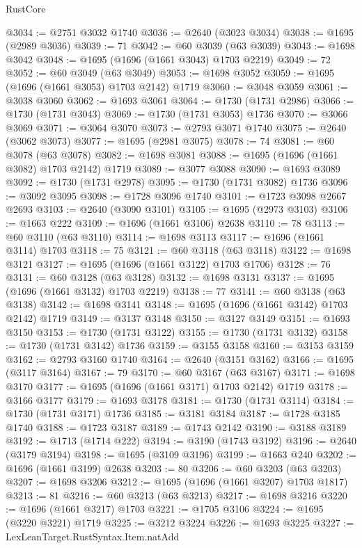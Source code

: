 \begin{lexlean}{RustCore}
\begin{coremodule}
@3034 := @2751 @3032 @1740
@3036 := @2640 (@3023 @3034)
@3038 := @1695 (@2989 @3036)
@3039 := 71
@3042 := @60 @3039 (@63 @3039)
@3043 := @1698 @3042
@3048 := @1695 (@1696 (@1661 @3043) @1703 @2219)
@3049 := 72
@3052 := @60 @3049 (@63 @3049)
@3053 := @1698 @3052
@3059 := @1695 (@1696 (@1661 @3053) @1703 @2142) @1719
@3060 := @3048 @3059
@3061 := @3038 @3060
@3062 := @1693 @3061
@3064 := @1730 (@1731 @2986)
@3066 := @1730 (@1731 @3043)
@3069 := @1730 (@1731 @3053) @1736
@3070 := @3066 @3069
@3071 := @3064 @3070
@3073 := @2793 @3071 @1740
@3075 := @2640 (@3062 @3073)
@3077 := @1695 (@2981 @3075)
@3078 := 74
@3081 := @60 @3078 (@63 @3078)
@3082 := @1698 @3081
@3088 := @1695 (@1696 (@1661 @3082) @1703 @2142) @1719
@3089 := @3077 @3088
@3090 := @1693 @3089
@3092 := @1730 (@1731 @2978)
@3095 := @1730 (@1731 @3082) @1736
@3096 := @3092 @3095
@3098 := @1728 @3096 @1740
@3101 := @1723 @3098 @2667 @2693
@3103 := @2640 (@3090 @3101)
@3105 := @1695 (@2973 @3103)
@3106 := @1663 @222
@3109 := @1696 (@1661 @3106) @2638
@3110 := 78
@3113 := @60 @3110 (@63 @3110)
@3114 := @1698 @3113
@3117 := @1696 (@1661 @3114) @1703
@3118 := 75
@3121 := @60 @3118 (@63 @3118)
@3122 := @1698 @3121
@3127 := @1695 (@1696 (@1661 @3122) @1703 @1706)
@3128 := 76
@3131 := @60 @3128 (@63 @3128)
@3132 := @1698 @3131
@3137 := @1695 (@1696 (@1661 @3132) @1703 @2219)
@3138 := 77
@3141 := @60 @3138 (@63 @3138)
@3142 := @1698 @3141
@3148 := @1695 (@1696 (@1661 @3142) @1703 @2142) @1719
@3149 := @3137 @3148
@3150 := @3127 @3149
@3151 := @1693 @3150
@3153 := @1730 (@1731 @3122)
@3155 := @1730 (@1731 @3132)
@3158 := @1730 (@1731 @3142) @1736
@3159 := @3155 @3158
@3160 := @3153 @3159
@3162 := @2793 @3160 @1740
@3164 := @2640 (@3151 @3162)
@3166 := @1695 (@3117 @3164)
@3167 := 79
@3170 := @60 @3167 (@63 @3167)
@3171 := @1698 @3170
@3177 := @1695 (@1696 (@1661 @3171) @1703 @2142) @1719
@3178 := @3166 @3177
@3179 := @1693 @3178
@3181 := @1730 (@1731 @3114)
@3184 := @1730 (@1731 @3171) @1736
@3185 := @3181 @3184
@3187 := @1728 @3185 @1740
@3188 := @1723 @3187
@3189 := @1743 @2142
@3190 := @3188 @3189
@3192 := @1713 (@1714 @222)
@3194 := @3190 (@1743 @3192)
@3196 := @2640 (@3179 @3194)
@3198 := @1695 (@3109 @3196)
@3199 := @1663 @240
@3202 := @1696 (@1661 @3199) @2638
@3203 := 80
@3206 := @60 @3203 (@63 @3203)
@3207 := @1698 @3206
@3212 := @1695 (@1696 (@1661 @3207) @1703 @1817)
@3213 := 81
@3216 := @60 @3213 (@63 @3213)
@3217 := @1698 @3216
@3220 := @1696 (@1661 @3217) @1703
@3221 := @1705 @3106
@3224 := @1695 (@3220 @3221) @1719
@3225 := @3212 @3224
@3226 := @1693 @3225
@3227 := LexLeanTarget.RustSyntax.Item.natAdd

\end{coremodule}
\end{lexlean}
